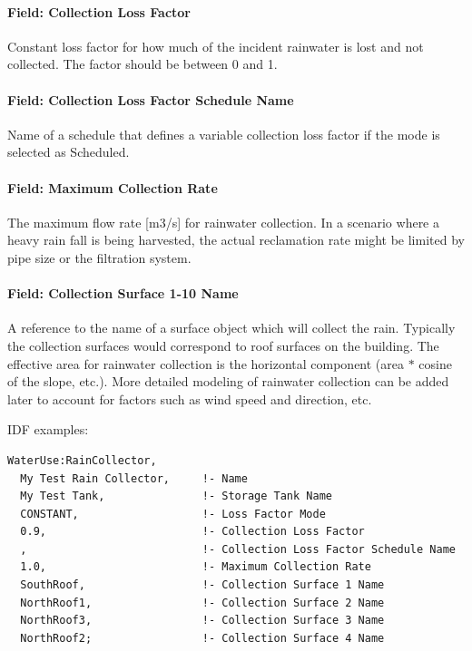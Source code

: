 \paragraph{Field: Collection Loss Factor}\label{field-collection-loss-factor}

Constant loss factor for how much of the incident rainwater is lost and not collected. The factor should be between 0 and 1.

\paragraph{Field: Collection Loss Factor Schedule Name}\label{field-collection-loss-factor-schedule-name}

Name of a schedule that defines a variable collection loss factor if the mode is selected as Scheduled.

\paragraph{Field: Maximum Collection Rate}\label{field-maximum-collection-rate}

The maximum flow rate {[}m3/s{]} for rainwater collection. In a scenario where a heavy rain fall is being harvested, the actual reclamation rate might be limited by pipe size or the filtration system.

\paragraph{Field: Collection Surface 1-10 Name}\label{field-collection-surface-1-10-name}

A reference to the name of a surface object which will collect the rain. Typically the collection surfaces would correspond to roof surfaces on the building. The effective area for rainwater collection is the horizontal component (area $*$ cosine of the slope, etc.). More detailed modeling of rainwater collection can be added later to account for factors such as wind speed and direction, etc.

IDF examples:

\begin{lstlisting}
WaterUse:RainCollector,
  My Test Rain Collector,     !- Name
  My Test Tank,               !- Storage Tank Name
  CONSTANT,                   !- Loss Factor Mode
  0.9,                        !- Collection Loss Factor
  ,                           !- Collection Loss Factor Schedule Name
  1.0,                        !- Maximum Collection Rate
  SouthRoof,                  !- Collection Surface 1 Name
  NorthRoof1,                 !- Collection Surface 2 Name
  NorthRoof3,                 !- Collection Surface 3 Name
  NorthRoof2;                 !- Collection Surface 4 Name
\end{lstlisting}

